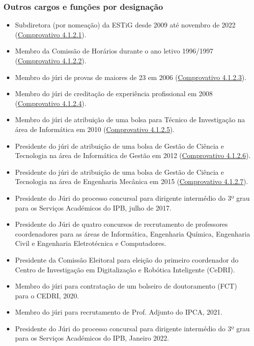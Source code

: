\documentclass[11pt]{article}
\begin{document}
\subsubsection{Outros cargos e funções por designação}
\begin{itemize}
\item {Subdiretora (por nomeação) da ESTiG desde 2009 até novembro de 2022 (\href{run:MissaoIPBCargos/subdiretora.pdf}{Comprovativo 4.1.2.1}).}
\item {Membro da Comissão de Horários durante o ano letivo 1996/1997 (\href{run:MissaoIPBoutros/comissaoHorarios.pdf}{Comprovativo 4.1.2.2}).}
\item {Membro do júri de provas de maiores de 23 em 2006 (\href{run:JuriProvas/Maiores23.pdf}{Comprovativo 4.1.2.3}).}
\item {Membro do júri de creditação de experiência profissional em 2008 (\href{run:JuriProvas/JuriExpProf.pdf}{Comprovativo 4.1.2.4}).}
\item {Membro do júri de atribuição de uma bolsa para Técnico de Investigação na área de Informática em 2010 (\href{run:JuriProvas/BolsaCIMO.pdf}{Comprovativo 4.1.2.5}).}
\item {Presidente do júri de atribuição de uma bolsa de Gestão de Ciência e Tecnologia na área de Informática de Gestão em 2012 (\href{run:JuriProvas/BolsaIG.pdf}{Comprovativo 4.1.2.6}).}
\item {Presidente do júri de atribuição de uma bolsa de Gestão de Ciência e Tecnologia na área de Engenharia Mecânica em 2015 (\href{run:JuriProvas/BolsaFabLab.pdf}{Comprovativo 4.1.2.7}).}
\item {Presidente do Júri do processo concursal para dirigente intermédio do 3º grau para os Serviços Académicos do IPB, julho de 2017.}
\item {Presidente do Júri de quatro concursos de recrutamento de professores coordenadores para as áreas de Informática, Engenharia Química, Engenharia Civil e Engenharia Eletrotécnica e Computadores.}
\item {Presidente da Comissão Eleitoral para eleição do primeiro coordenador do Centro de Investigação em Digitalização e Robótica Inteligente (CeDRI).}
\item {Membro do júri para contratação de um bolseiro de doutoramento (FCT) para o CEDRI, 2020.}
\item {Membro do júri para recrutamento de Prof. Adjunto do IPCA, 2021.}
\item {Presidente do Júri do processo concursal para dirigente intermédio do 3º grau para os Serviços Académicos do IPB, Janeiro 2022.}

\end{itemize}
\end{document}

